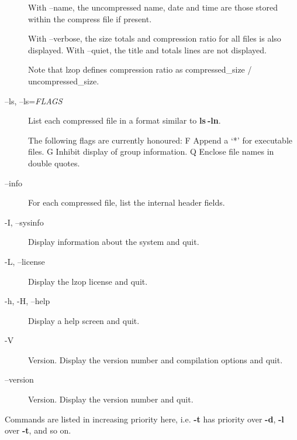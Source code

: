 \begin{description}
With --name, the uncompressed name, date and time
are those stored within the compress file if present.



With --verbose, the size totals and compression
ratio for all files is also displayed. With
--quiet, the title and totals lines are not displayed.



Note that lzop defines compression ratio
as compressed\_size / uncompressed\_size.


\item[--ls, --ls=\textit{FLAGS}] \mbox{}

List each compressed file in a format similar to \textbf{ls$\:$-ln}.



The following flags are currently honoured:
  F  Append a `*' for executable files.
  G  Inhibit display of group information.
  Q  Enclose file names in double quotes.


\item[--info] \mbox{}

For each compressed file, list the internal header fields.


\item[-I, --sysinfo] \mbox{}

Display information about the system and quit.


\item[-L, --license] \mbox{}

Display the lzop license and quit.


\item[-h, -H, --help] \mbox{}

Display a help screen and quit.


\item[-V] \mbox{}

Version. Display the version number and compilation
options and quit.


\item[--version] \mbox{}

Version. Display the version number and quit.

\end{description}


Commands are listed in increasing priority here, i.e.
\textbf{-t} has priority over \textbf{-d}, \textbf{-l} over \textbf{-t}, and so on.


